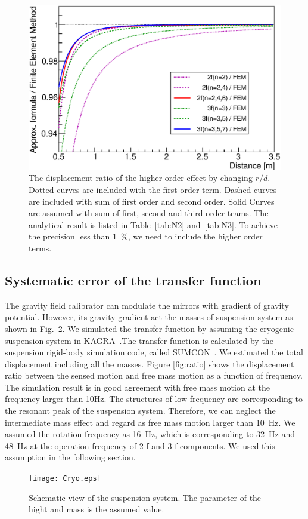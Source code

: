 \documentclass[A4]{spie}  %
\begin{document}
\begin{figure}
\begin{center}
\includegraphics[width=12cm]{dvsx_ratio.eps}
\caption{The displacement ratio of the higher order effect by changing $r/d$. Dotted curves are included with the first order term. Dashed curves are included with sum of first order and second order. Solid Curves are assumed with sum of first, second and third order teams. The analytical result is listed in Table~\ref{tab:N2} and~\ref{tab:N3}. To achieve the precision less than 1~\%, we need to include the higher order terms.}
\label{fig:FEM}
\end{center}
\end{figure}


\subsection{Systematic error of the transfer function}
The gravity field calibrator can modulate the mirrors with gradient of gravity potential. However, its gravity gradient act the masses of suspension system as shown in Fig.~\ref{fig:cryo}. We simulated the transfer function by assuming the cryogenic suspension system in KAGRA~\cite{0264-9381-34-22-225001}.The transfer function is calculated by the suspension rigid-body simulation code, called SUMCON~\cite{SUMCON}. We estimated the total displacement including all the masses. Figure \ref{fig:ratio} shows the displacement ratio between the sensed motion and free mass motion as a function of frequency. The simulation result is in good agreement with free mass motion at the frequency larger than 10Hz. The structures of low frequency are corresponding to the resonant peak of the suspension system. Therefore, we can neglect the intermediate mass effect and regard as free mass motion larger than 10~Hz. We assumed the rotation frequency as 16~Hz, which is corresponding to 32~Hz and 48~Hz at the operation frequency of 2-f and 3-f components.  We used this assumption in the following section.
\begin{figure}
\begin{center}
\texttt{[image: Cryo.eps]}
\caption{Schematic view of the suspension system. The parameter of the hight and mass is the assumed value. }
\label{fig:cryo}
\end{center}
\end{figure}
\end{document}
